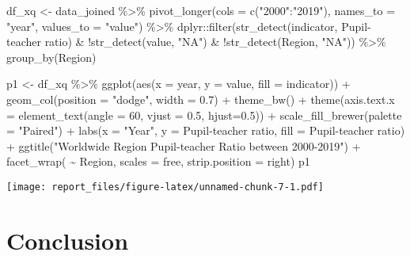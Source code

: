\documentclass[11pt,a4paper,]{article}
\newenvironment{Shaded}{\begin{snugshade}}{\end{snugshade}}
\newcommand{\AttributeTok}[1]{\textcolor[rgb]{0.77,0.63,0.00}{#1}}
\newcommand{\DecValTok}[1]{\textcolor[rgb]{0.00,0.00,0.81}{#1}}
\newcommand{\FloatTok}[1]{\textcolor[rgb]{0.00,0.00,0.81}{#1}}
\newcommand{\FunctionTok}[1]{\textcolor[rgb]{0.00,0.00,0.00}{#1}}
\newcommand{\NormalTok}[1]{#1}
\newcommand{\OtherTok}[1]{\textcolor[rgb]{0.56,0.35,0.01}{#1}}
\newcommand{\SpecialCharTok}[1]{\textcolor[rgb]{0.00,0.00,0.00}{#1}}
\newcommand{\StringTok}[1]{\textcolor[rgb]{0.31,0.60,0.02}{#1}}
\begin{document}
\begin{Shaded}
\begin{Highlighting}[]
\NormalTok{df\_xq }\OtherTok{\textless{}{-}}\NormalTok{ data\_joined }\SpecialCharTok{\%\textgreater{}\%}
   \FunctionTok{pivot\_longer}\NormalTok{(}\AttributeTok{cols =} \FunctionTok{c}\NormalTok{(}\StringTok{"2000"}\SpecialCharTok{:}\StringTok{"2019"}\NormalTok{),}
               \AttributeTok{names\_to =} \StringTok{"year"}\NormalTok{,}
               \AttributeTok{values\_to =} \StringTok{"value"}\NormalTok{) }\SpecialCharTok{\%\textgreater{}\%}
\NormalTok{ dplyr}\SpecialCharTok{::}\FunctionTok{filter}\NormalTok{(}\FunctionTok{str\_detect}\NormalTok{(indicator, }\StringTok{\textquotesingle{}Pupil{-}teacher ratio\textquotesingle{}}\NormalTok{) }\SpecialCharTok{\&} \SpecialCharTok{!}\FunctionTok{str\_detect}\NormalTok{(value, }\StringTok{"NA"}\NormalTok{) }\SpecialCharTok{\&} \SpecialCharTok{!}\FunctionTok{str\_detect}\NormalTok{(Region, }\StringTok{"NA"}\NormalTok{)) }\SpecialCharTok{\%\textgreater{}\%}
 \FunctionTok{group\_by}\NormalTok{(Region) }
  
\NormalTok{p1 }\OtherTok{\textless{}{-}}\NormalTok{ df\_xq }\SpecialCharTok{\%\textgreater{}\%}
 \FunctionTok{ggplot}\NormalTok{(}\FunctionTok{aes}\NormalTok{(}\AttributeTok{x =}\NormalTok{ year,}
            \AttributeTok{y =}\NormalTok{ value,}
         \AttributeTok{fill =}\NormalTok{ indicator)) }\SpecialCharTok{+}
  \FunctionTok{geom\_col}\NormalTok{(}\AttributeTok{position =} \StringTok{"dodge"}\NormalTok{, }\AttributeTok{width =} \FloatTok{0.7}\NormalTok{) }\SpecialCharTok{+}
  \FunctionTok{theme\_bw}\NormalTok{() }\SpecialCharTok{+}
  \FunctionTok{theme}\NormalTok{(}\AttributeTok{axis.text.x =} \FunctionTok{element\_text}\NormalTok{(}\AttributeTok{angle =} \DecValTok{60}\NormalTok{, }\AttributeTok{vjust =} \FloatTok{0.5}\NormalTok{, }\AttributeTok{hjust=}\FloatTok{0.5}\NormalTok{)) }\SpecialCharTok{+}
  \FunctionTok{scale\_fill\_brewer}\NormalTok{(}\AttributeTok{palette =} \StringTok{"Paired"}\NormalTok{) }\SpecialCharTok{+}
  \FunctionTok{labs}\NormalTok{(}\AttributeTok{x =} \StringTok{"Year"}\NormalTok{,}
       \AttributeTok{y =} \StringTok{\textquotesingle{}Pupil{-}teacher ratio\textquotesingle{}}\NormalTok{,}
       \AttributeTok{fill =} \StringTok{\textquotesingle{}Pupil{-}teacher ratio\textquotesingle{}}\NormalTok{) }\SpecialCharTok{+}
  \FunctionTok{ggtitle}\NormalTok{(}\StringTok{"Worldwide Region Pupil{-}teacher Ratio between 2000{-}2019"}\NormalTok{) }\SpecialCharTok{+}
  \FunctionTok{facet\_wrap}\NormalTok{( }\SpecialCharTok{\textasciitilde{}}\NormalTok{ Region,}
              \AttributeTok{scales =} \StringTok{\textquotesingle{}free\textquotesingle{}}\NormalTok{,}
              \AttributeTok{strip.position =} \StringTok{\textquotesingle{}right\textquotesingle{}}\NormalTok{)}
\NormalTok{p1}
\end{Highlighting}
\end{Shaded}

\texttt{[image: report\_files/figure-latex/unnamed-chunk-7-1.pdf]}

\section*{Conclusion}

\printbibliography
\end{document}
